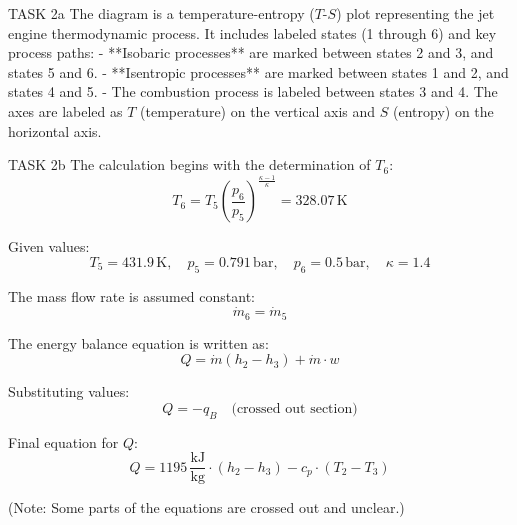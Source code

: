 TASK 2a  
The diagram is a temperature-entropy (\( T \)-\( S \)) plot representing the jet engine thermodynamic process. It includes labeled states (1 through 6) and key process paths:  
- **Isobaric processes** are marked between states 2 and 3, and states 5 and 6.  
- **Isentropic processes** are marked between states 1 and 2, and states 4 and 5.  
- The combustion process is labeled between states 3 and 4.  
The axes are labeled as \( T \) (temperature) on the vertical axis and \( S \) (entropy) on the horizontal axis.  

TASK 2b  
The calculation begins with the determination of \( T_6 \):  
\[
T_6 = T_5 \left( \frac{p_6}{p_5} \right)^{\frac{\kappa - 1}{\kappa}} = 328.07 \, \text{K}
\]  

Given values:  
\[
T_5 = 431.9 \, \text{K}, \quad p_5 = 0.791 \, \text{bar}, \quad p_6 = 0.5 \, \text{bar}, \quad \kappa = 1.4
\]  

The mass flow rate is assumed constant:  
\[
\dot{m}_6 = \dot{m}_5
\]  

The energy balance equation is written as:  
\[
Q = \dot{m} \left( h_2 - h_3 \right) + \dot{m} \cdot w
\]  

Substituting values:  
\[
Q = -q_B \quad \text{(crossed out section)}  
\]  

Final equation for \( Q \):  
\[
Q = 1195 \, \frac{\text{kJ}}{\text{kg}} \cdot \left( h_2 - h_3 \right) - c_p \cdot (T_2 - T_3)
\]  

(Note: Some parts of the equations are crossed out and unclear.)  